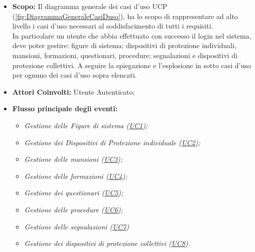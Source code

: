 	\begin{itemize}
		\item \textbf{Scopo:} Il diagramma generale dei casi d'uso UCP (\autoref{fig:DiagrammaGeneraleCasiDuso}), ha lo scopo di rappresentare ad alto livello i casi d'uso necessari al soddisfacimento di tutti i requisiti. \\
		In particolare un utente che abbia effettuato con successo il login nel sistema, deve poter gestire: figure di sistema; dispositivi di protezione individuali, mansioni, formazioni, questionari, procedure; segnalazioni e dispositivi di protezione collettivi.
		A seguire la spiegazione e l'esplosione in sotto casi d'uso per ognuno dei casi d'uso sopra elencati.
		\item \textbf{Attori Coinvolti:} Utente Autenticato;
		\item \textbf{Flusso principale degli eventi:} 
			\begin{itemize}
				\item \textit{Gestione delle Figure di sistema (\hyperref[section:UC1]{UC1});}
				\item \textit{Gestione dei Dispositivi di Protezione individuale (\hyperref[section:UC2]{UC2});}
				\item \textit{Gestione delle mansioni (\hyperref[section:UC3]{UC3});}
				\item \textit{Gestione delle formazioni (\hyperref[section:UC4]{UC4});}
				\item \textit{Gestione dei questionari (\hyperref[section:UC5]{UC5});}
				\item \textit{Gestione delle procedure (\hyperref[section:UC6]{UC6});}
				\item \textit{Gestione delle segnalazioni (\hyperref[section:UC7]{UC7})}
				\item \textit{Gestione dei dispositivi di protezione collettivi (\hyperref[section:UC8]{UC8}).}
			\end{itemize}
	\end{itemize}
	

